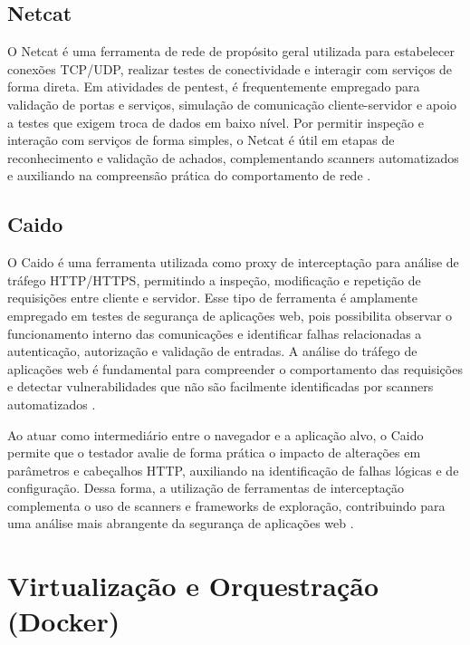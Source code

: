         \subsection{Netcat}

            O Netcat é uma ferramenta de rede de propósito geral utilizada para estabelecer conexões TCP/UDP, realizar testes de 
            conectividade e interagir com serviços de forma direta. Em atividades de pentest, é frequentemente empregado para validação
            de portas e serviços, simulação de comunicação cliente-servidor e apoio a testes que exigem troca de dados em baixo nível.
            Por permitir inspeção e interação com serviços de forma simples, o Netcat é útil em etapas de reconhecimento e validação de achados,
            complementando scanners automatizados e auxiliando na compreensão prática do comportamento de rede \citep{stallings2017network,moreno2019introduccao}.
        
        \subsection{Caido}

            O Caido é uma ferramenta utilizada como proxy de interceptação para análise de tráfego HTTP/HTTPS, permitindo a inspeção,
            modificação e repetição de requisições entre cliente e servidor. Esse tipo de ferramenta é amplamente empregado em testes
            de segurança de aplicações web, pois possibilita observar o funcionamento interno das comunicações e identificar falhas
            relacionadas a autenticação, autorização e validação de entradas. A análise do tráfego de aplicações web
            é fundamental para compreender o comportamento das requisições e detectar vulnerabilidades que não são facilmente identificadas
            por scanners automatizados \citep{moreno2019introduccao}.
            
            Ao atuar como intermediário entre o navegador e a aplicação alvo, o Caido permite que o testador avalie de forma prática
            o impacto de alterações em parâmetros e cabeçalhos HTTP, auxiliando na identificação de falhas lógicas e de configuração.
            Dessa forma, a utilização de ferramentas de interceptação complementa o uso de scanners e frameworks de exploração, 
            contribuindo para uma análise mais abrangente da segurança de aplicações web \citep{stallings2017network}.

\section{Virtualização e Orquestração (Docker)}

